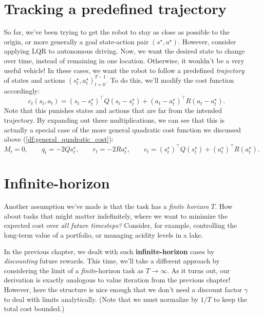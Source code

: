 \documentclass[../main/main]{subfiles}
\begin{document}
\section{Tracking a predefined trajectory}

So far, we've been trying to get the robot to stay as close as possible to the origin, or more generally a goal state-action pair $(s^\star, a^\star).$ However, consider applying LQR to autonomous driving. Now, we want the desired state to change over time, instead of remaining in one location. Otherwise, it wouldn't be a very useful vehicle!
In these cases, we want the robot to follow a predefined \emph{trajectory} of
states and actions $(s_t^\star, a_t^\star)_{t=0}^{T-1}$. To do this, we'll modify the cost function accordingly:
\[
    c_t(s_t, a_t) = (s_t - s^\star_t)^\top Q (s_t - s^\star_t) + (a_t - a^\star_t)^\top R (a_t - a^\star_t).
\]
Note that this punishes states and actions that are far from the intended trajectory. By expanding out these multiplications, we can see that this is actually a special case of the more general quadratic cost function we discussed above (\autoref{df:general_quadratic_cost}): \[
    M_t = 0, \qquad q_t = -2Q s^\star_t, \qquad r_t = -2R a^\star_t, \qquad c_t = (s^\star_t)^\top Q (s^\star_t) + (a^\star_t)^\top R (a^\star_t).
\]


\section{Infinite-horizon}

Another assumption we've made is that the task has a \emph{finite horizon} $T$. How about tasks that might matter indefinitely, where we want to minimize the expected cost over \emph{all future timesteps?} Consider, for example, controlling the long-term value of a portfolio, or managing acidity levels in a lake.

In the previous chapter, we dealt with such \textbf{infinite-horizon} cases by \emph{discounting} future rewards. This time, we'll take a different approach by considering the limit of a \emph{finite}-horizon task as $T \to \infty$.
As it turns out, our derivation is exactly analogous to value iteration from the previous chapter! However, here the structure is nice enough that we don't need a discount factor $\gamma$ to deal with limits analytically. (Note that we must normalize by $1/T$ to keep the total cost bounded.)
\end{document}
